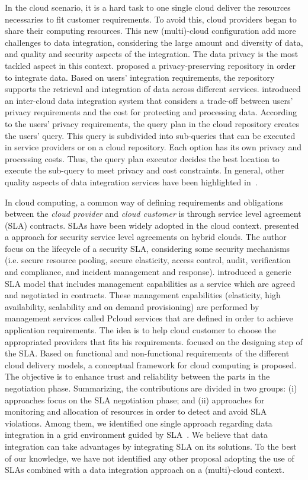 \documentclass[12pt,a4paper,oneside]{report}
\begin{document}
In the cloud scenario, it is a hard task to one single cloud deliver the resources necessaries to fit customer requirements. 
To avoid this, cloud providers began to share their computing resources.
This new (multi)-cloud configuration add more challenges to data integration, considering the large amount and diversity of data, and quality and security aspects of the integration.
The data privacy is the most tackled aspect in this context.
\cite{YauY08} proposed a privacy-preserving repository in order to integrate data. 
Based on users' integration requirements, the repository supports the retrieval and integration of data across different services. 
\cite{096} introduced an inter-cloud data integration system that considers a trade-off between users' privacy requirements and the cost for protecting and processing data.
According to the users' privacy requirements, the query plan in the cloud repository 
creates the users' query. 
This query is subdivided into sub-queries that can be executed in  service providers or on a cloud repository.
Each option has its own  privacy and processing costs.
Thus, the query plan executor decides the best location to execute the sub-query
to meet privacy and cost constraints. In general, other quality aspects of data integration services have been highlighted in~\cite{Dustdar:2012}.

In cloud computing, a common way of defining requirements and obligations between the \textit{cloud provider} and \textit{cloud customer} is through service level agreement (SLA) contracts. 
SLAs have been widely adopted in the cloud context. 
\cite{011} presented a approach for security service level agreements on hybrid clouds. The author focus on the lifecycle of a security SLA, considering some security mechanisms (i.e. secure resource pooling, secure elasticity, access control, audit, verification and compliance, and incident management and response).
\cite{009} introduced a generic SLA model that includes management capabilities as a service which are agreed and negotiated in contracts. These management capabilities (elasticity, high availability, scalability and on demand provisioning) are performed by management services called Pcloud services that are defined in order to achieve application requirements. The idea is to help cloud customer to choose the appropriated providers that fits his requirements. 
\cite{005} focused on the designing step of the SLA. 
Based on functional and non-functional requirements of the different cloud delivery models, a conceptual framework for cloud computing is proposed. 
The objective is to enhance trust and reliability between the parts in the negotiation phase.
Summarizing, the contributions are divided in two groups: (i) approaches focus on the SLA negotiation phase; and (ii) approaches for monitoring and allocation of resources in order to detect and avoid SLA violations. Among them, we identified one single approach regarding data integration in a grid environment guided by SLA~\cite{Nie07}.
We believe that data integration can take advantages by integrating SLA on its solutions. 
To the best of our knowledge, we have not identified any other proposal adopting the use of SLAs combined with a data integration approach on a (multi)-cloud context.
\end{document}
